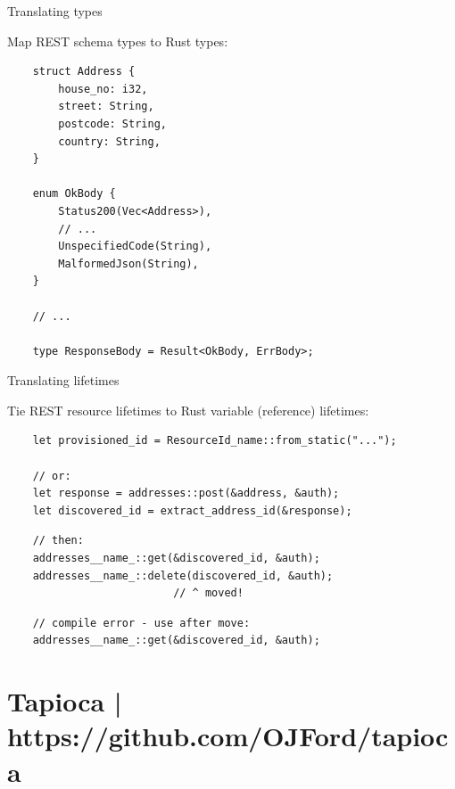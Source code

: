 \documentclass[10pt]{beamer}
\begin{document}
\begin{frame}[fragile]{Translating types}

    Map REST schema types to Rust types\pause:
    \begin{verbatim}
    struct Address {
        house_no: i32,
        street: String,
        postcode: String,
        country: String,
    }
    
    enum OkBody {
        Status200(Vec<Address>),
        // ...
        UnspecifiedCode(String),
        MalformedJson(String),
    }
    
    // ...
    
    type ResponseBody = Result<OkBody, ErrBody>;
    \end{verbatim}
    
\end{frame}

\begin{frame}[fragile]{Translating lifetimes}

    Tie REST resource lifetimes to Rust variable (reference) lifetimes\pause:
    \begin{verbatim}
    let provisioned_id = ResourceId_name::from_static("...");
    
    // or:
    let response = addresses::post(&address, &auth);
    let discovered_id = extract_address_id(&response);
    \end{verbatim}

    \pause
    \begin{verbatim}
    // then:
    addresses__name_::get(&discovered_id, &auth);
    addresses__name_::delete(discovered_id, &auth);
                          // ^ moved!
    \end{verbatim}
    
    \pause
    \begin{verbatim}
    // compile error - use after move:
    addresses__name_::get(&discovered_id, &auth);
    \end{verbatim}

\end{frame}

\section[Tapioca]{Tapioca | https://github.com/OJFord/tapioca}
\end{document}

